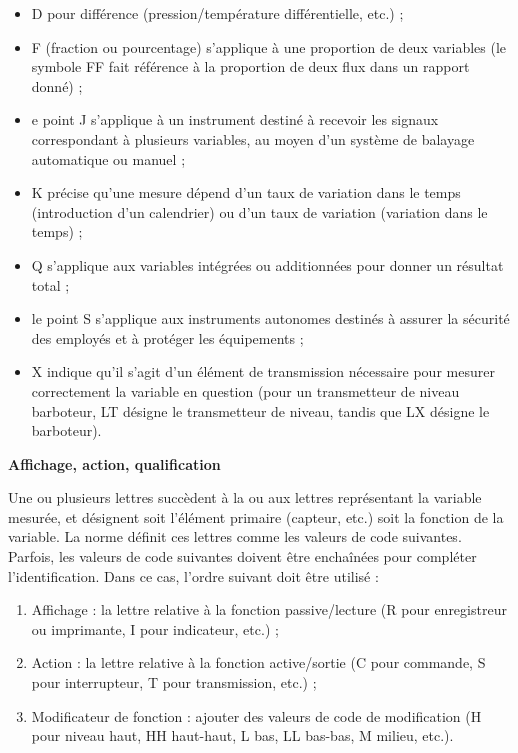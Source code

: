  \begin{itemize}
\item 	D pour différence (pression/température différentielle, etc.) ;
\item 	F (fraction ou pourcentage) s'applique à une proportion de deux variables (le symbole FF fait référence à la proportion de deux flux dans un rapport donné) ;
\item e point 	J s'applique à un instrument destiné à recevoir les signaux correspondant à plusieurs variables, au moyen d'un système de balayage automatique ou manuel ;
\item 	K précise qu'une mesure dépend d'un taux de variation dans le temps (introduction d'un calendrier) ou d'un taux de variation (variation dans le temps) ;
\item 	Q s'applique aux variables intégrées ou additionnées pour donner un résultat total ;
\item le point 	S s'applique aux instruments autonomes destinés à assurer la sécurité des employés et à protéger les équipements ;
\item 	X indique qu'il s'agit d'un élément de transmission nécessaire pour mesurer correctement la variable en question (pour un transmetteur de niveau barboteur, LT désigne le transmetteur de niveau, tandis que LX désigne le barboteur).
\end{itemize}

\vspace{0.3cm}
\textbf{	Affichage, action, qualification}
\vspace{0.3cm}


Une ou plusieurs lettres succèdent à la ou aux lettres représentant la variable mesurée, et désignent soit l'élément primaire (capteur, etc.) soit la fonction de la variable. La norme définit ces lettres comme les valeurs de code suivantes.
Parfois, les valeurs de code suivantes doivent être enchaînées pour compléter l'identification. Dans ce cas, l'ordre suivant doit être utilisé : 

\begin{enumerate}
\item 	Affichage : la lettre relative à la fonction passive/lecture (R pour enregistreur ou imprimante, I pour indicateur, etc.) ; 
\item 	Action : la lettre relative à la fonction active/sortie (C pour commande, S pour interrupteur, T pour transmission, etc.) ;
\item 	Modificateur de fonction : ajouter des valeurs de code de modification (H pour niveau haut, HH haut-haut, L bas, LL bas-bas, M milieu, etc.).
\end{enumerate}

